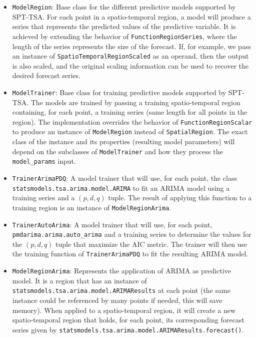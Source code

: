 \begin{itemize}
	\item \texttt{ModelRegion}: Base class for the different predictive models supported by SPT-TSA. For each point in a spatio-temporal region, a model will produce a series that represents the predicted values of the predictive variable. It is achieved by extending the behavior of \texttt{FunctionRegionSeries}, where the length of the series represents the size of the forecast. If, for example, we pass an instance of \texttt{SpatioTemporalRegionScaled} as an operand, then the output is also scaled, and the original scaling information can be used to recover the desired forecast series.
	
	\item \texttt{ModelTrainer}: Base class for training predictive models supported by SPT-TSA. The models are trained by passing a training spatio-temporal region containing, for each point, a training series (same length for all points in the region). The implementation overrides the behavior of \texttt{FunctionRegionScalar} to produce an instance of \texttt{ModelRegion} instead of \texttt{SpatialRegion}. The exact class of the instance and its properties (resulting model parameters) will depend on the subclasses of \texttt{ModelTrainer} and how they process the \texttt{model\_params} input.
	
	\item \texttt{TrainerArimaPDQ}: A model trainer that will use, for each point, the class \\ \texttt{statsmodels.tsa.arima.model.ARIMA} to fit an ARIMA model using a training series and a $(p, d, q)$ tuple. The result of applying this function to a training region is an instance of \texttt{ModelRegionArima}.
	
	\item \texttt{TrainerAutoArima}: A model trainer that will use, for each point, \\
	\texttt{pmdarima.arima.auto\_arima} and a training series to determine the values for the $(p, d, q)$ tuple that maximize the AIC metric. The trainer will then use the training function of \texttt{TrainerArimaPDQ} to fit the resulting ARIMA model.
	
	\item \texttt{ModelRegionArima}: Represents the application of ARIMA as predictive model. It is a region that has an instance of \texttt{statsmodels.tsa.arima.model.ARIMAResults} at each point (the same instance could be referenced by many points if needed, this will save memory). When applied to a spatio-temporal region, it will create a new spatio-temporal region that holds, for each point, its corresponding forecast series given by \texttt{statsmodels.tsa.arima.model.ARIMAResults.forecast()}.
	

\end{itemize}
